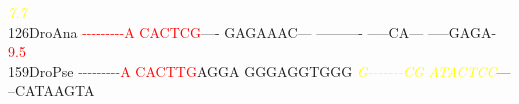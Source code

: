 \documentclass[11pt,twoside,reqno,a4paper]{article}
\begin{document}
{\hspace*{4\charwidth}\hspace*{7\charwidth}\hspace*{1\charwidth}\hspace*{1\charwidth}\hspace*{20\charwidth}\textit{\textcolor{Yellow}{7.7}}\hspace*{1\charwidth}\hspace*{1\charwidth}\hspace*{1\charwidth}\hspace*{1\charwidth}\\
126\hspace*{1\charwidth}DroAna	\textcolor{Red}{-}\textcolor{Red}{-}\textcolor{Red}{-}\textcolor{Red}{-}\textcolor{Red}{-}\textcolor{Red}{-}\textcolor{Red}{-}\textcolor{Red}{-}\textcolor{Red}{-}\textcolor{Red}{A}	\textcolor{Red}{C}\textcolor{Red}{A}\textcolor{Red}{C}\textcolor{Red}{T}\textcolor{Red}{C}\textcolor{Red}{G}----	GAGAAAC---	----------	-----CA---	-----GAGA-	\\
\hspace*{4\charwidth}\hspace*{7\charwidth}\hspace*{0\charwidth}\textcolor{Red}{9.5}\hspace*{1\charwidth}\hspace*{1\charwidth}\hspace*{1\charwidth}\hspace*{1\charwidth}\hspace*{1\charwidth}\hspace*{1\charwidth}\\
159\hspace*{1\charwidth}DroPse	\textcolor{Red}{-}\textcolor{Red}{-}\textcolor{Red}{-}\textcolor{Red}{-}\textcolor{Red}{-}\textcolor{Red}{-}\textcolor{Red}{-}\textcolor{Red}{-}\textcolor{Red}{-}\textcolor{Red}{A}	\textcolor{Red}{C}\textcolor{Red}{A}\textcolor{Red}{C}\textcolor{Red}{T}\textcolor{Red}{T}\textcolor{Red}{G}AGGA	GGGAGGTGGG	\textit{\textcolor{Yellow}{G}}\textit{\textcolor{Yellow}{-}}\textit{\textcolor{Yellow}{-}}\textit{\textcolor{Yellow}{-}}\textit{\textcolor{Yellow}{-}}\textit{\textcolor{Yellow}{-}}\textit{\textcolor{Yellow}{-}}\textit{\textcolor{Yellow}{-}}\textit{\textcolor{Yellow}{C}}\textit{\textcolor{Yellow}{G}}	\textit{\textcolor{Yellow}{A}}\textit{\textcolor{Yellow}{T}}\textit{\textcolor{Yellow}{A}}\textit{\textcolor{Yellow}{C}}\textit{\textcolor{Yellow}{T}}\textit{\textcolor{Yellow}{C}}\textit{\textcolor{Yellow}{C}}---	--CATAAGTA	\\
}
\end{document}
